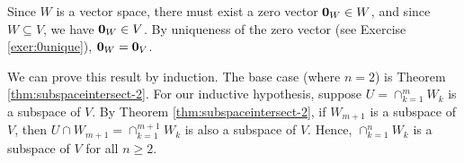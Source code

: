 \begin{sltn}
Since $ W $ is a vector space, there must exist a zero vector $ \mathbf{0}_W\in W $, and since $ W\subseteq V $, we have $ \mathbf{0}_W\in V $. By uniqueness of the zero vector (see Exercise \ref{exer:0unique}), $ \mathbf{0}_W=\mathbf{0}_V $.
\end{sltn}

\begin{sltn}
We can prove this result by induction. The base case (where $ n=2 $) is Theorem \ref{thm:subspaceintersect-2}. For our inductive hypothesis, suppose $ U=\cap_{k=1}^m W_k $ is a subspace of $ V $. By Theorem \ref{thm:subspaceintersect-2}, if $ W_{m+1} $ is a subspace of $ V $, then $ U\cap W_{m+1}=\cap_{k=1}^{m+1}W_k $ is also a subspace of $ V $. Hence, $ \cap_{k=1}^n W_k $ is a subspace of $ V $ for all $ n\geq 2 $.
\end{sltn}